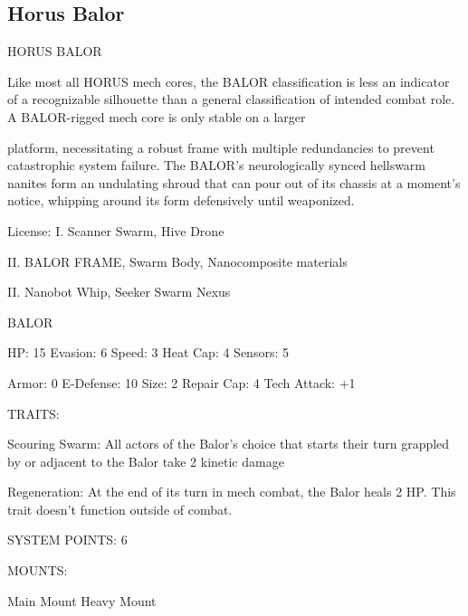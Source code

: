 \subsection{Horus Balor}
                                                                                                                      


                                           HORUS BALOR  

Like most all HORUS mech cores, the BALOR classification is less an indicator of a recognizable silhouette  
than a general classification of intended combat role. A BALOR-rigged mech core is only stable on a larger  

platform, necessitating a robust frame with multiple redundancies to prevent catastrophic system failure.  
The BALOR’s neurologically synced hellswarm nanites form an undulating shroud that can pour out of its  
chassis at a moment’s notice, whipping around its form defensively until weaponized.  

                                                  License:  
I. Scanner Swarm, Hive Drone
 
II. BALOR FRAME, Swarm Body, Nanocomposite materials
 
II. Nanobot Whip, Seeker Swarm Nexus
 

                                                 BALOR 

 HP: 15         Evasion: 6                           Speed: 3           Heat Cap: 4       Sensors: 5 

 Armor: 0       E-Defense: 10                        Size: 2            Repair Cap: 4     Tech Attack:  
                                                                                          +1 

                                                  TRAITS: 

 Scouring Swarm: All actors of the Balor’s choice that starts their turn grappled by or adjacent to the  
 Balor take 2 kinetic damage
 
 Regeneration: At the end of its turn in mech combat, the Balor heals 2 HP. This trait doesn’t function  
 outside of combat. 

                                            SYSTEM POINTS: 6 

                                                 MOUNTS: 

 Main Mount                                          Heavy Mount 

